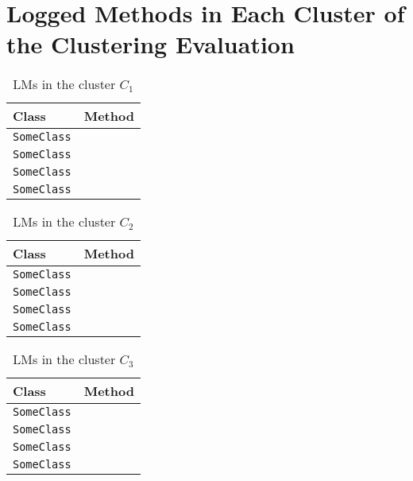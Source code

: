 
\chapter{Logged Methods in Each Cluster of the Clustering Evaluation}\label{append}

\begin{table}[!tbh]
\centering\caption{LMs in the cluster $C_1$}
\begin{tabular}{ll}\toprule
Class&Method\\\midrule
\lstinline/SomeClass/&\raisebox{-2pt}{\lstinline/foo(int)/}\\
\lstinline/SomeClass/&\raisebox{-2pt}{\lstinline/foo(int)/}\\
\lstinline/SomeClass/&\raisebox{-2pt}{\lstinline/foo(int)/}\\
\lstinline/SomeClass/&\raisebox{-2pt}{\lstinline/foo(int)/}\\
\bottomrule
\end{tabular}
\end{table}

\begin{table}[!tbh]
\caption{LMs in the cluster $C_2$}
\centering\begin{tabular}{ll}\toprule
Class&Method\\\midrule
\lstinline/SomeClass/&\raisebox{-2pt}{\lstinline/foo(int)/}\\
\lstinline/SomeClass/&\raisebox{-2pt}{\lstinline/foo(int)/}\\
\lstinline/SomeClass/&\raisebox{-2pt}{\lstinline/foo(int)/}\\
\lstinline/SomeClass/&\raisebox{-2pt}{\lstinline/foo(int)/}\\
\bottomrule
\end{tabular}
\end{table}

\begin{table}[!tbh]
\caption{LMs in the cluster $C_3$}
\centering\begin{tabular}{ll}\toprule
Class&Method\\\midrule
\lstinline/SomeClass/&\raisebox{-2pt}{\lstinline/foo(int)/}\\
\lstinline/SomeClass/&\raisebox{-2pt}{\lstinline/foo(int)/}\\
\lstinline/SomeClass/&\raisebox{-2pt}{\lstinline/foo(int)/}\\
\lstinline/SomeClass/&\raisebox{-2pt}{\lstinline/foo(int)/}\\
\bottomrule
\end{tabular}
\end{table}
